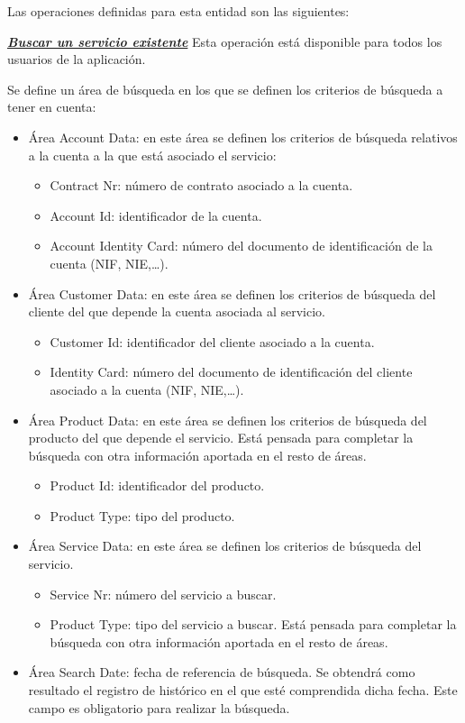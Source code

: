 Las operaciones definidas para esta entidad son las siguientes:


\underline{\textsl{\textbf{Buscar un servicio existente}}}\newline
Esta operación está disponible para todos los usuarios de la aplicación.

Se define un área de búsqueda en los que se definen los criterios de búsqueda a tener en cuenta:

\begin{itemize}
	\item Área Account Data: en este área se definen los criterios de búsqueda relativos a la cuenta a la que está asociado el servicio:
		\begin{itemize}
			\item Contract Nr: número de contrato asociado a la cuenta.
			\item Account Id: identificador de la cuenta.
			\item Account Identity Card: número del documento de identificación de la cuenta (NIF, NIE,\dots).
		\end{itemize}
	\item Área Customer Data: en este área se definen los criterios de búsqueda del cliente del que depende la cuenta asociada al servicio.
		\begin{itemize}
			\item Customer Id: identificador del cliente asociado a la cuenta.
			\item Identity Card: número del documento de identificación del cliente asociado a la cuenta (NIF, NIE,\dots).
		\end{itemize}
	\item Área Product Data: en este área se definen los criterios de búsqueda del producto del que depende el servicio. Está pensada para completar la búsqueda con otra información aportada en el resto de áreas.	
		\begin{itemize}
			\item Product Id: identificador del producto.
			\item Product Type: tipo del producto.
		\end{itemize}
	\item Área Service Data: en este área se definen los criterios de búsqueda del servicio.
		\begin{itemize}
			\item Service Nr: número del servicio a buscar.
			\item Product Type: tipo del servicio a buscar. Está pensada para completar la búsqueda con otra información aportada en el resto de áreas.
		\end{itemize}
	\item Área Search Date: fecha de referencia de búsqueda. Se obtendrá como resultado el registro de histórico en el que esté comprendida dicha fecha. Este campo es obligatorio para realizar la búsqueda.
\end{itemize}

